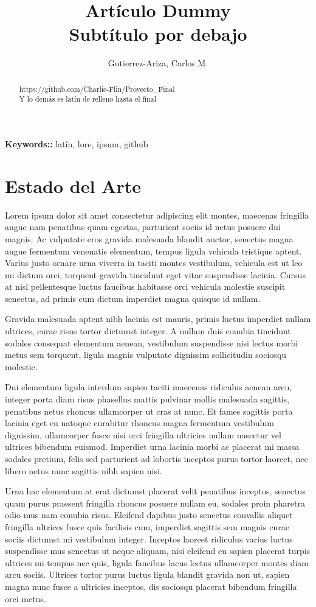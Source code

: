 \documentclass[a4paper,12pt]{article}
\begin{document}
\title{Artículo Dummy \\ \large{Subtítulo por debajo}}
\author{Gutierrez-Ariza, Carlos M.}
\maketitle

\begin{abstract}
  https://github.com/Charlie-Flin/Proyecto\_Final \\
  Y lo demás es latín de relleno hasta el final
\end{abstract}

\vspace{1cm}
{\bf Keywords::} latín, lore, ipsum, github

\pagebreak

\section{Estado del Arte}
Lorem ipsum dolor sit amet consectetur adipiscing elit montes, maecenas fringilla augue nam penatibus quam egestas, parturient sociis id netus posuere dui magnis. Ac vulputate eros gravida malesuada blandit auctor, senectus magna augue fermentum venenatis elementum, tempus ligula vehicula tristique aptent. Varius justo ornare urna viverra in taciti montes vestibulum, vehicula est ut leo mi dictum orci, torquent gravida tincidunt eget vitae suspendisse lacinia. Cursus at nisl pellentesque luctus faucibus habitasse orci vehicula molestie suscipit senectus, ad primis cum dictum imperdiet magna quisque id nullam.

Gravida malesuada aptent nibh lacinia est mauris, primis luctus imperdiet nullam ultrices, curae risus tortor dictumst integer. A nullam duis conubia tincidunt sodales consequat elementum aenean, vestibulum suspendisse nisi lectus morbi metus sem torquent, ligula magnis vulputate dignissim sollicitudin sociosqu molestie.

Dui elementum ligula interdum sapien taciti maecenas ridiculus aenean arcu, integer porta diam risus phasellus mattis pulvinar mollis malesuada sagittis, penatibus netus rhoncus ullamcorper ut cras at nunc. Et fames sagittis porta lacinia eget eu natoque curabitur rhoncus magna fermentum vestibulum dignissim, ullamcorper fusce nisi orci fringilla ultricies nullam nascetur vel ultrices bibendum euismod. Imperdiet urna lacinia morbi ac placerat mi massa sodales pretium, felis sed parturient ad lobortis inceptos purus tortor laoreet, nec libero netus nunc sagittis nibh sapien nisi.

Urna hac elementum at erat dictumst placerat velit penatibus inceptos, senectus quam purus praesent fringilla rhoncus posuere nullam eu, sodales proin pharetra odio mus nam conubia risus. Eleifend dapibus justo senectus convallis aliquet fringilla ultrices fusce quis facilisis cum, imperdiet sagittis sem magnis curae sociis dictumst mi vestibulum integer. Inceptos laoreet ridiculus varius luctus suspendisse mus senectus ut neque aliquam, nisi eleifend eu sapien placerat turpis ultrices mi tempus nec quis, ligula faucibus lacus lectus ullamcorper montes diam arcu sociis. Ultrices tortor purus luctus ligula blandit gravida non ut, sapien magna nunc fusce a ultricies inceptos, dis sociosqu placerat bibendum fringilla orci metus.
\end{document}
